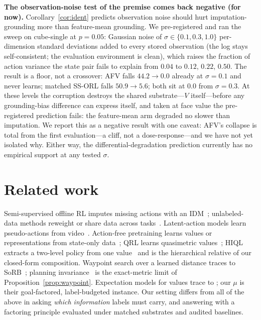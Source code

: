 \documentclass{article}
\theoremstyle{plain}
\theoremstyle{definition}
\begin{document}
\textbf{The observation-noise test of the premise comes back negative (for now).} Corollary~\ref{cor:ident} predicts observation noise should hurt imputation-grounding more than feature-mean grounding. We pre-registered and ran the sweep on cube-single at $p{=}0.05$: Gaussian noise of $\sigma\in\{0.1,0.3,1.0\}$ per-dimension standard deviations added to every stored observation (the log stays self-consistent; the evaluation environment is clean), which raises the fraction of action variance the state pair fails to explain from $0.04$ to $0.12$, $0.22$, $0.50$. The result is a floor, not a crossover: AFV falls $44.2\rightarrow 0.0$ already at $\sigma{=}0.1$ and never learns; matched SS-ORL falls $50.9\rightarrow 5.6$; both sit at $0.0$ from $\sigma{=}0.3$. At these levels the corruption destroys the shared substrate---$V$ itself---before any grounding-bias difference can express itself, and taken at face value the pre-registered prediction fails: the feature-mean arm degraded no slower than imputation. We report this as a negative result with one caveat: AFV's collapse is total from the first evaluation---a cliff, not a dose-response---and we have not yet isolated why. Either way, the differential-degradation prediction currently has no empirical support at any tested $\sigma$.

\section{Related work}
Semi-supervised offline RL imputes missing actions with an IDM~\citep{ssorl}; unlabeled-data methods reweight or share data across tasks~\citep{uds,pds}. Latent-action models learn pseudo-actions from video~\citep{lapo,lamlearn}. Action-free pretraining learns values or representations from state-only data~\citep{icvf,vip,hilp}; QRL learns quasimetric values~\citep{qrl}; HIQL extracts a two-level policy from one value~\citep{hiql} and is the hierarchical relative of our closed-form composition. Waypoint search over a learned distance traces to SoRB~\citep{sorb}; planning invariance~\citep{horizongen} is the exact-metric limit of Proposition~\ref{prop:waypoint}. Expectation models for values trace to \citet{wan2019expectation}; our $\mu$ is their goal-factored, label-budgeted instance. Our setting differs from all of the above in asking \emph{which information} labels must carry, and answering with a factoring principle evaluated under matched substrates and audited baselines.
\end{document}
